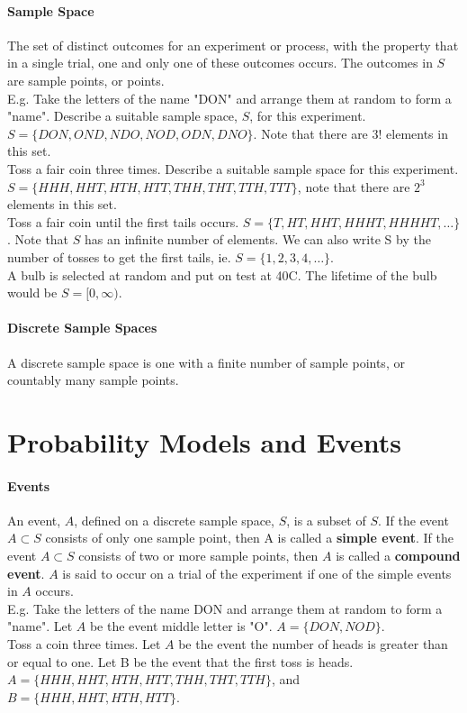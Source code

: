 \documentclass[10pt,letter]{article}
\begin{document}
\paragraph{Sample Space}
The set of distinct outcomes for an experiment or process, with the property that in a single trial, one and only one of these outcomes occurs. The outcomes in $S$ are sample points, or points.\\ 
E.g. Take the letters of the name "DON" and arrange them at random to form a "name". Describe a suitable sample space, $S$, for this experiment. $S=\{DON,OND,NDO,NOD,ODN,DNO\}$. Note that there are $3!$ elements in this set. \\ 
Toss a fair coin three times. Describe a suitable sample space for this experiment. $S=\{HHH,HHT,HTH,HTT,THH,THT,TTH,TTT\}$, note that there are $2^3$ elements in this set. \\ 
Toss a fair coin until the first tails occurs. $S=\{T,HT,HHT,HHHT,HHHHT, \ldots\}$. Note that $S$ has an infinite number of elements. We can also write S by the number of tosses to get the first tails, ie. $S=\{1,2,3,4,\ldots\}$. \\ 
A bulb is selected at random and put on test at 40\degree C. The lifetime of the bulb would be $S=[0,\infty)$. 

\paragraph{Discrete Sample Spaces}
A discrete sample space is one with a finite number of sample points, or countably many sample points. 

\section*{Probability Models and Events}
\paragraph{Events}
An event, $A$, defined on a discrete sample space, $S$, is a subset of $S$. If the event $A\subset S$ consists of only one sample point, then A is called a \textbf{simple event}. If the event $A\subset S$ consists of two or more sample points, then $A$ is called a \textbf{compound event}. $A$ is said to occur on a trial of the experiment if one of the simple events in $A$ occurs. \\ 
E.g. Take the letters of the name DON and arrange them at random to form a "name". Let $A$ be the event middle letter is "O". $A=\{DON,NOD\}$. \\ 
Toss a coin three times. Let $A$ be the event the number of heads is greater than or equal to one. Let B be the event that the first toss is heads. $A = \{HHH,HHT,HTH,HTT,THH,THT,TTH\}$, and $B=\{HHH,HHT,HTH,HTT\}$. 
\end{document}
